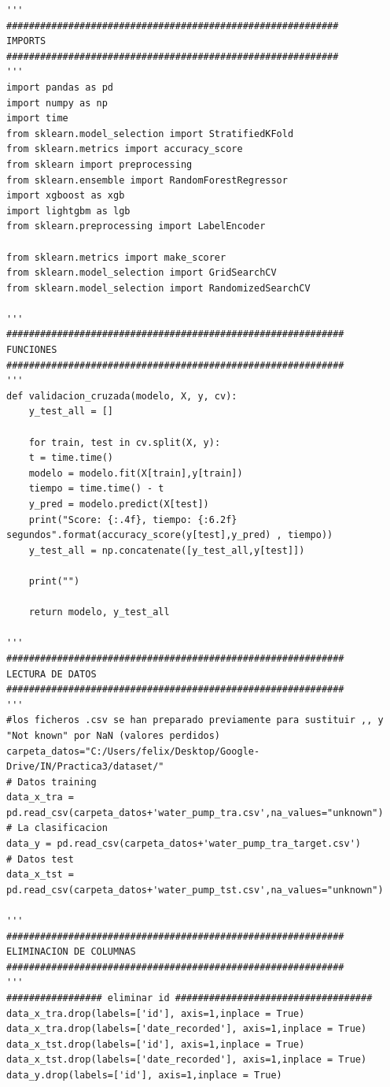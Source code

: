 	\lstset{language=python}
	\begin{lstlisting}[frame=single]
'''
###########################################################
IMPORTS
###########################################################
'''
import pandas as pd
import numpy as np
import time
from sklearn.model_selection import StratifiedKFold
from sklearn.metrics import accuracy_score
from sklearn import preprocessing
from sklearn.ensemble import RandomForestRegressor
import xgboost as xgb
import lightgbm as lgb
from sklearn.preprocessing import LabelEncoder

from sklearn.metrics import make_scorer
from sklearn.model_selection import GridSearchCV
from sklearn.model_selection import RandomizedSearchCV

'''
############################################################
FUNCIONES
############################################################
'''
def validacion_cruzada(modelo, X, y, cv):
	y_test_all = []
	
	for train, test in cv.split(X, y):
	t = time.time()
	modelo = modelo.fit(X[train],y[train])
	tiempo = time.time() - t
	y_pred = modelo.predict(X[test])
	print("Score: {:.4f}, tiempo: {:6.2f} segundos".format(accuracy_score(y[test],y_pred) , tiempo))
	y_test_all = np.concatenate([y_test_all,y[test]])
	
	print("")
	
	return modelo, y_test_all

'''
############################################################
LECTURA DE DATOS
############################################################
'''
#los ficheros .csv se han preparado previamente para sustituir ,, y "Not known" por NaN (valores perdidos)
carpeta_datos="C:/Users/felix/Desktop/Google-Drive/IN/Practica3/dataset/"
# Datos training
data_x_tra = pd.read_csv(carpeta_datos+'water_pump_tra.csv',na_values="unknown")
# La clasificacion
data_y = pd.read_csv(carpeta_datos+'water_pump_tra_target.csv')
# Datos test
data_x_tst = pd.read_csv(carpeta_datos+'water_pump_tst.csv',na_values="unknown")

'''
############################################################
ELIMINACION DE COLUMNAS
############################################################
'''
################# eliminar id ###################################
data_x_tra.drop(labels=['id'], axis=1,inplace = True)
data_x_tra.drop(labels=['date_recorded'], axis=1,inplace = True)
data_x_tst.drop(labels=['id'], axis=1,inplace = True)
data_x_tst.drop(labels=['date_recorded'], axis=1,inplace = True)
data_y.drop(labels=['id'], axis=1,inplace = True)


\end{lstlisting}
